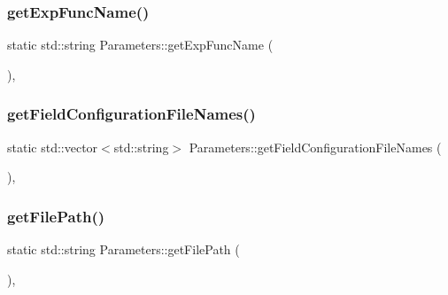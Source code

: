 \subsubsection{\texorpdfstring{getExpFuncName()}{getExpFuncName()}}
{\footnotesize\ttfamily static std\+::string Parameters\+::get\+Exp\+Func\+Name (\begin{DoxyParamCaption}{ }\end{DoxyParamCaption})\hspace{0.3cm}{\ttfamily [inline]}, {\ttfamily [static]}}

\mbox{\label{class_parameters_a3ed137b5c7d4271b470df14ee2557004}} 
\subsubsection{\texorpdfstring{getFieldConfigurationFileNames()}{getFieldConfigurationFileNames()}}
{\footnotesize\ttfamily static std\+::vector$<$std\+::string$>$ Parameters\+::get\+Field\+Configuration\+File\+Names (\begin{DoxyParamCaption}{ }\end{DoxyParamCaption})\hspace{0.3cm}{\ttfamily [inline]}, {\ttfamily [static]}}

\mbox{\label{class_parameters_abace4edb8ece38841b58c5ce6168cbc4}} 
\subsubsection{\texorpdfstring{getFilePath()}{getFilePath()}}
{\footnotesize\ttfamily static std\+::string Parameters\+::get\+File\+Path (\begin{DoxyParamCaption}{ }\end{DoxyParamCaption})\hspace{0.3cm}{\ttfamily [inline]}, {\ttfamily [static]}}

